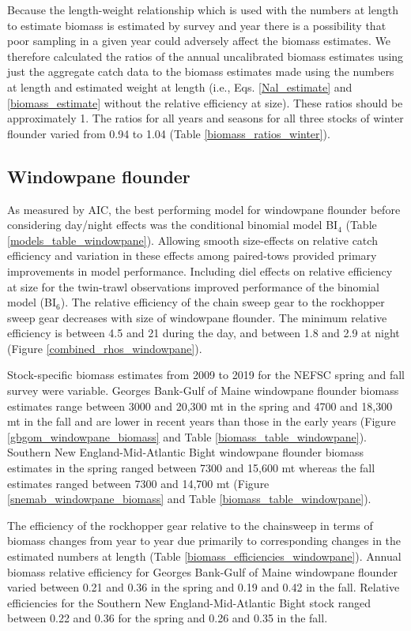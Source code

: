 \documentclass[]{article}
\begin{document}
Because the length-weight relationship which is used with the numbers at
length to estimate biomass is estimated by survey and year there is a
possibility that poor sampling in a given year could adversely affect
the biomass estimates. We therefore calculated the ratios of the annual
uncalibrated biomass estimates using just the aggregate catch data to
the biomass estimates made using the numbers at length and estimated
weight at length (i.e., Eqs. \ref{Nal_estimate} and
\ref{biomass_estimate} without the relative efficiency at size). These
ratios should be approximately 1. The ratios for all years and seasons
for all three stocks of winter flounder varied from 0.94 to 1.04 (Table
\ref{biomass_ratios_winter}).

\hypertarget{windowpane-flounder}{%
\subsection{Windowpane flounder}\label{windowpane-flounder}}

As measured by AIC, the best performing model for windowpane flounder
before considering day/night effects was the conditional binomial model
BI\(_4\) (Table \ref{models_table_windowpane}). Allowing smooth
size-effects on relative catch efficiency and variation in these effects
among paired-tows provided primary improvements in model performance.
Including diel effects on relative efficiency at size for the twin-trawl
observations improved performance of the binomial model (BI\(_6\)). The
relative efficiency of the chain sweep gear to the rockhopper sweep gear
decreases with size of windowpane flounder. The minimum relative
efficiency is between 4.5 and 21 during the day, and between 1.8 and 2.9
at night (Figure \ref{combined_rhos_windowpane}).

Stock-specific biomass estimates from 2009 to 2019 for the NEFSC spring
and fall survey were variable. Georges Bank-Gulf of Maine windowpane
flounder biomass estimates range between 3000 and 20,300 mt in the
spring and 4700 and 18,300 mt in the fall and are lower in recent years
than those in the early years (Figure \ref{gbgom_windowpane_biomass} and
Table \ref{biomass_table_windowpane}). Southern New England-Mid-Atlantic
Bight windowpane flounder biomass estimates in the spring ranged between
7300 and 15,600 mt whereas the fall estimates ranged between 7300 and
14,700 mt (Figure \ref{snemab_windowpane_biomass} and Table
\ref{biomass_table_windowpane}).

The efficiency of the rockhopper gear relative to the chainsweep in
terms of biomass changes from year to year due primarily to
corresponding changes in the estimated numbers at length (Table
\ref{biomass_efficiencies_windowpane}). Annual biomass relative
efficiency for Georges Bank-Gulf of Maine windowpane flounder varied
between 0.21 and 0.36 in the spring and 0.19 and 0.42 in the fall.
Relative efficiencies for the Southern New England-Mid-Atlantic Bight
stock ranged between 0.22 and 0.36 for the spring and 0.26 and 0.35 in
the fall.
\end{document}

